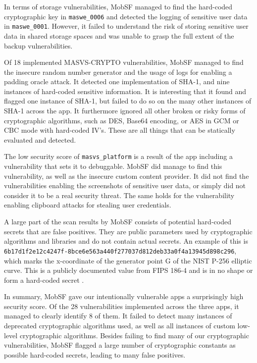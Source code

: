In terms of storage vulnerabilities, MobSF managed to find the hard-coded cryptographic key in \texttt{maswe\_0006} and detected the logging of sensitive user data in \texttt{maswe\_0001}. However, it failed to understand the risk of storing sensitive user data in shared storage spaces and was unable to grasp the full extent of the backup vulnerabilities.

Of 18 implemented MASVS-CRYPTO vulnerabilities, MobSF managed to find the insecure random number generator and the usage of logs for enabling a padding oracle attack. It detected one implementation of SHA-1, and nine instances of hard-coded sensitive information. It is interesting that it found and flagged one instance of SHA-1, but failed to do so on the many other instances of SHA-1 across the app. It furthermore ignored all other broken or risky forms of cryptographic algorithms, such as DES, Base64 encoding, or AES in GCM or CBC mode with hard-coded IV's. These are all things that can be statically evaluated and detected.

The low security score of \texttt{masvs\_platform} is a result of the app including a vulnerability that sets it to debuggable. MobSF did manage to find this vulnerability, as well as the insecure custom content provider. It did not find the vulnerabilities enabling the screenshots of sensitive user data, or simply did not consider it to be a real security threat. The same holds for the vulnerability enabling clipboard attacks for stealing user credentials.

A large part of the scan results by MobSF consists of potential hard-coded secrets that are false positives. They are public parameters used by cryptographic algorithms and libraries and do not contain actual secrets. An example of this is \texttt{6b17d1f2e12c4247f-\linebreak[0]8bce6e563a440f277037d812deb33a0f4a13945d898c296}, which marks the x-coordinate of the generator point G of the NIST P-256 elliptic curve. This is a publicly documented value from FIPS 186-4 and is in no shape or form a hard-coded secret \cite{fips186-4}.

In summary, MobSF gave our intentionally vulnerable apps a surprisingly high security score. Of the 28 vulnerabilities implemented across the three apps, it managed to clearly identify 8 of them. It failed to detect many instances of deprecated cryptographic algorithms used, as well as all instances of custom low-level cryptographic algorithms. Besides failing to find many of our cryptographic vulnerabilities, MobSF flagged a large number of cryptographic constants as possible hard-coded secrets, leading to many false positives.


